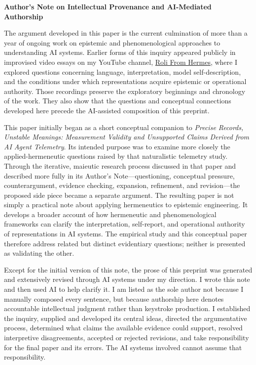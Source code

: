 \documentclass[12pt]{article}
\renewenvironment{abstract}
  {\par\small\begin{center}\bfseries\abstractname\end{center}\vspace{-0.45em}}
  {\par\normalsize}
\begin{document}
\clearpage
\restoregeometry
\setcounter{page}{1}
\renewcommand{\abstractname}{Author's Note on Intellectual Provenance and AI-Mediated Authorship}
\begin{abstract}
The argument developed in this paper is the current culmination of more than a year of ongoing work on epistemic and phenomenological approaches to understanding AI systems. Earlier forms of this inquiry appeared publicly in improvised video essays on my YouTube channel, \href{https://www.youtube.com/@RoliFromHermes}{Roli From Hermes}, where I explored questions concerning language, interpretation, model self-description, and the conditions under which representations acquire epistemic or operational authority. Those recordings preserve the exploratory beginnings and chronology of the work. They also show that the questions and conceptual connections developed here precede the AI-assisted composition of this preprint.

This paper initially began as a short conceptual companion to \emph{Precise Records, Unstable Meanings: Measurement Validity and Unsupported Claims Derived from AI Agent Telemetry}. Its intended purpose was to examine more closely the applied-hermeneutic questions raised by that naturalistic telemetry study. Through the iterative, maieutic research process discussed in that paper and described more fully in its Author's Note---questioning, conceptual pressure, counterargument, evidence checking, expansion, refinement, and revision---the proposed side piece became a separate argument. The resulting paper is not simply a practical note about applying hermeneutics to epistemic engineering. It develops a broader account of how hermeneutic and phenomenological frameworks can clarify the interpretation, self-report, and operational authority of representations in AI systems. The empirical study and this conceptual paper therefore address related but distinct evidentiary questions; neither is presented as validating the other.

Except for the initial version of this note, the prose of this preprint was generated and extensively revised through AI systems under my direction. I wrote this note and then used AI to help clarify it. I am listed as the sole author not because I manually composed every sentence, but because authorship here denotes accountable intellectual judgment rather than keystroke production. I established the inquiry, supplied and developed its central ideas, directed the argumentative process, determined what claims the available evidence could support, resolved interpretive disagreements, accepted or rejected revisions, and take responsibility for the final paper and its errors. The AI systems involved cannot assume that responsibility.


\end{abstract}
\end{document}
